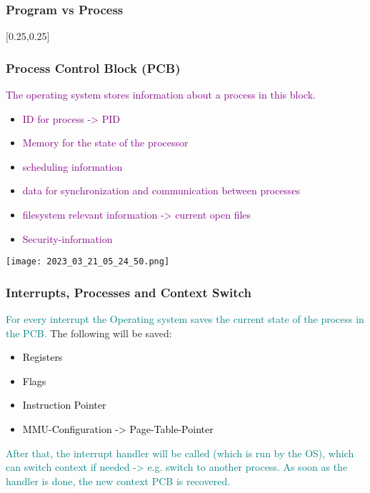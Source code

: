 \documentclass[main.tex,fontsize=8pt,paper=a4,paper=portrait,DIV=calc,]{scrartcl}
\begin{document}
\subsubsection{Program vs Process}
[0.25,0.25]

\subsubsection{Process Control Block (PCB)}
\textcolor{purple}{The operating system stores information about a process in this block.}
\begin{itemize}
\item \textcolor{purple}{ID for process -> PID}
\item \textcolor{purple}{Memory for the state of the processor}
\item \textcolor{purple}{scheduling information}
\item \textcolor{purple}{data for synchronization and communication between processes}
\item \textcolor{purple}{filesystem relevant information -> current open files}
\item \textcolor{purple}{Security-information}
\end{itemize} 
\texttt{[image: 2023\_03\_21\_05\_24\_50.png]}

\subsubsection{Interrupts, Processes and Context Switch}
\textcolor{teal}{For every interrupt the Operating system saves the current state of the process in the PCB.}\newline
The following will be saved:
\begin{itemize}
\item \textcolor{black}{Registers}
\item \textcolor{black}{Flags}
\item \textcolor{black}{Instruction Pointer}
\item \textcolor{black}{MMU-Configuration -> Page-Table-Pointer}
\end{itemize} 
\textcolor{teal}{After that, the interrupt handler will be called (which is run by the OS), which can switch context if needed -> e.g. switch to another process.\newline
As soon as the handler is done, the new context PCB is recovered.}
\end{document}
